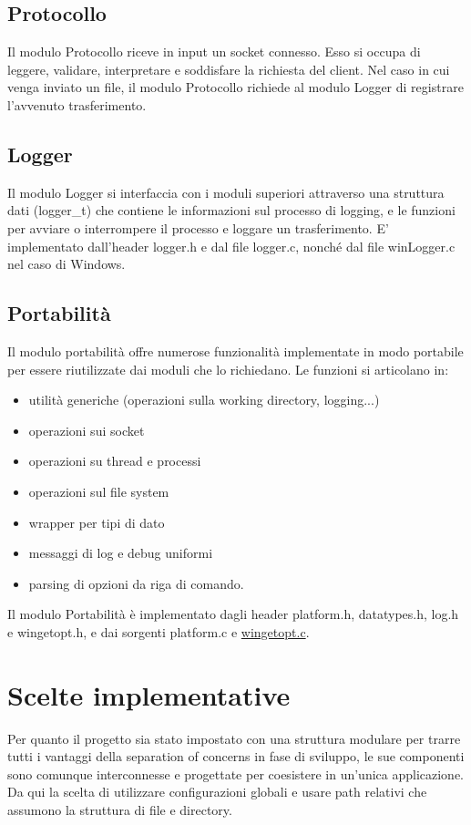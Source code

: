 \documentclass{article}
\begin{document}
\subsection{Protocollo}
Il modulo Protocollo riceve in input un socket connesso.
Esso si occupa di leggere, validare, interpretare e soddisfare la richiesta del client.
Nel caso in cui venga inviato un file, il modulo Protocollo richiede al modulo Logger di registrare 
l'avvenuto trasferimento.

\subsection{Logger}
Il modulo Logger si interfaccia con i moduli superiori attraverso una struttura dati (logger\_t) che
contiene le informazioni sul processo di logging, e le funzioni per avviare o interrompere il processo
e loggare un trasferimento.
E' implementato dall'header logger.h e dal file logger.c, nonché dal file winLogger.c nel caso di Windows. 


\subsection{Portabilità}
Il modulo portabilità offre numerose funzionalità implementate in modo portabile per essere riutilizzate
dai moduli che lo richiedano. Le funzioni si articolano in:
\begin{itemize}
    \item utilità generiche (operazioni sulla working directory, logging...)
    \item operazioni sui socket
    \item operazioni su thread e processi
    \item operazioni sul file system
    \item wrapper per tipi di dato
    \item messaggi di log e debug uniformi
    \item parsing di opzioni da riga di comando.
\end{itemize}
Il modulo Portabilità è implementato dagli header platform.h, datatypes.h, log.h e wingetopt.h, e dai 
sorgenti platform.c e \href{http://note.sonots.com/Comp/CompLang/cpp/getopt.html}{wingetopt.c}. 
\newpage


\section{Scelte implementative}

Per quanto il progetto sia stato impostato con una struttura modulare per trarre tutti i vantaggi della
separation of concerns in fase di sviluppo, le sue componenti sono comunque interconnesse e progettate per coesistere 
in un'unica applicazione. Da qui la scelta di utilizzare configurazioni globali 
e usare path relativi che assumono la struttura di file e directory.\\
\end{document}
